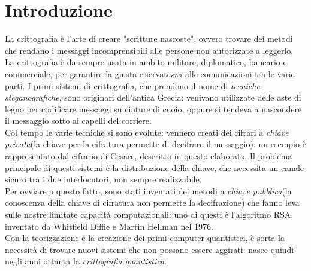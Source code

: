 \documentclass[italian,A4,12pt]{article}
\begin{document}
  \section{Introduzione}
  La crittografia è l'arte di creare "scritture nascoste", ovvero trovare dei metodi che rendano i messaggi incomprensibili alle persone non autorizzate a leggerlo. \\La crittografia è da sempre usata in ambito militare, diplomatico, bancario e commerciale, per garantire la giusta riservatezza alle comunicazioni tra le varie parti. I primi sistemi di crittografia, che prendono il nome di \textit{tecniche steganografiche}, sono originari dell'antica Grecia: venivano utilizzate delle aste di legno per codificare messaggi su cinture di cuoio, oppure si tendeva a nascondere il messaggio sotto ai capelli del corriere.\\
  Col tempo le varie tecniche si sono evolute: vennero creati dei cifrari a \textit{chiave privata}(la chiave per la cifratura permette di decifrare il messaggio): un esempio è rappresentato dal cifrario di Cesare, descritto in questo elaborato.
  Il problema principale di questi sistemi è la distribuzione della chiave, che necessita un canale sicuro tra i due interlocutori, non sempre realizzabile.\\
  Per ovviare a questo fatto, sono stati inventati dei metodi a \textit{chiave pubblica}(la conoscenza della chiave di cifratura non permette la decifrazione) che fanno leva sulle nostre limitate capacità computazionali: uno di questi è l'algoritmo RSA, inventato da Whitfield Diffie e Martin Hellman nel 1976.\\
  Con la teorizzazione e la creazione dei primi computer quantistici, è sorta la necessità di trovare nuovi sistemi che non possano essere aggirati: nasce quindi negli anni ottanta la \textit{crittografia quantistica}.
\end{document}
